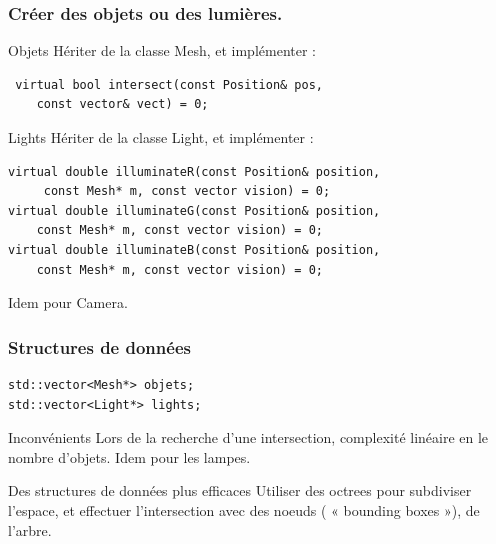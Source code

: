 \begin{frame}[fragile]
\frametitle{Créer des objets ou des lumières.}

\begin{block}{Objets}
Hériter de la classe Mesh, et implémenter :
\begin{verbatim}
 virtual bool intersect(const Position& pos, 
 	const vector& vect) = 0;
\end{verbatim}
\end{block}

\begin{block}{Lights}
Hériter de la classe Light, et implémenter :
\begin{verbatim}
virtual double illuminateR(const Position& position, 
	 const Mesh* m, const vector vision) = 0;
virtual double illuminateG(const Position& position, 
	const Mesh* m, const vector vision) = 0;
virtual double illuminateB(const Position& position, 
	const Mesh* m, const vector vision) = 0;
\end{verbatim}

\end{block}

Idem pour Camera.

\end{frame}

\begin{frame}[fragile]
\frametitle{Structures de données}

\begin{verbatim}
std::vector<Mesh*> objets;
std::vector<Light*> lights;

\end{verbatim}


{
	\begin{alertblock}{Inconvénients}
	Lors de la recherche d'une intersection, complexité linéaire en le nombre d'objets.
	Idem pour les lampes.
	\end{alertblock}
}

{
	\begin{block}{Des structures de données plus efficaces}
	Utiliser des octrees pour subdiviser l'espace, et effectuer l'intersection avec des noeuds ( « bounding boxes »), de l'arbre.
	\end{block}
}

\end{frame}


